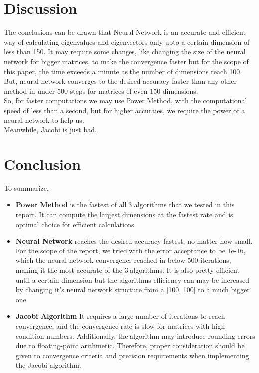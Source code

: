 \documentclass{article}
\begin{document}
\section{Discussion}
The conclusions can be drawn that Neural Network is an accurate and efficient way of calculating eigenvalues and eigenvectors only upto a certain dimension of less than 150. It may require some changes, like changing the size of the neural network for bigger matrices, to make the convergence faster but for the scope of this paper, the time exceeds a minute as the number of dimensions reach 100.
\\
But, neural network converges to the desired accuracy faster than any other method in under 500 steps for matrices of even 150 dimensions.
\\
So, for faster computations we may use Power Method, with the computational speed of less than a second, but for higher accuraies, we require the power of a neural network to help us.
\\
Meanwhile, Jacobi is just bad.

\section{Conclusion}
To summarize,

\begin{itemize}
    \item \large \textbf{Power Method} \normalsize is the fastest of all 3 algorithms that we tested in this report. It can compute the largest dimensions at the fastest rate and is optimal choice for efficient calculations.
    \item \large \textbf{Neural Network} \normalsize reaches the desired accuracy fastest, no matter how small. For the scope of the report, we tried with the error acceptance to be 1e-16, which the neural network convergence reached in below 500 iterations, making it the most accurate of the 3 algorithms. It is also pretty efficient until a certain dimension but the algorithms efficiency can may be increased by changing it's neural network structure from a [100, 100] to a much bigger one.
    \item \large \textbf{Jacobi Algorithm} \normalsize It requires a large number of iterations to reach convergence, and the convergence rate is slow for matrices with high condition numbers. Additionally, the algorithm may introduce rounding errors due to floating-point arithmetic. Therefore, proper consideration should be given to convergence criteria and precision requirements when implementing the Jacobi algorithm.
\end{itemize}
\end{document}
